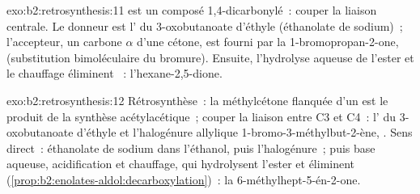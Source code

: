 \begin{solution}{exo:b2:retrosynthesis:11}
 est un composé 1,4-dicarbonylé~: couper la liaison  centrale. Le donneur
est l' du 3-oxobutanoate d'éthyle (éthanolate de sodium)~; l'accepteur, un carbone $\alpha$ d'une
cétone, est fourni par la 1-bromopropan-2-one,  (substitution bimoléculaire du bromure).
Ensuite, l'hydrolyse aqueuse de l'ester et le chauffage éliminent ~: l'hexane-2,5-dione.
\end{solution}

\begin{solution}{exo:b2:retrosynthesis:12}
Rétrosynthèse~: la méthylcétone flanquée d'un  est le produit de la synthèse acétylacétique~;
couper la liaison entre C3 et C4~: l' du 3-oxobutanoate d'éthyle et l'halogénure allylique
1-bromo-3-méthylbut-2-ène, . Sens direct~: éthanolate de sodium dans l'éthanol, puis
l'halogénure~; puis base aqueuse, acidification et chauffage, qui hydrolysent l'ester et éliminent 
(\cref{prop:b2:enolates-aldol:decarboxylation})~: la 6-méthylhept-5-én-2-one.
\end{solution}

